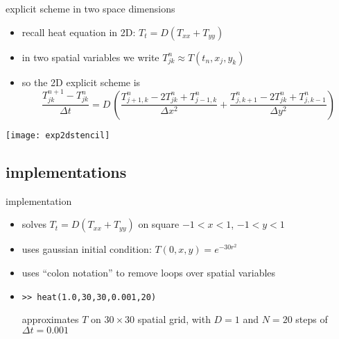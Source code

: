 \begin{frame}{explicit scheme in two space dimensions}

\begin{itemize}
\item recall heat equation in 2D: $T_t = D(T_{xx} + T_{yy})$
\item in two spatial variables we write $T_{jk}^n \approx T(t_n,x_j,y_k)$
\item so the 2D explicit scheme is
\small
	$$\frac{T_{jk}^{n+1} - T_{jk}^n}{\Delta t} = D\,\left(\frac{T_{j+1,k}^n - 2 T_{jk}^n + T_{j-1,k}^n}{\Delta x^2} + \frac{T_{j,k+1}^n - 2 T_{jk}^n + T_{j,k-1}^n}{\Delta y^2}\right)$$
\end{itemize}

\bigskip
\begin{center}
\texttt{[image: exp2dstencil]}
\end{center}
\end{frame}


\subsection{implementations}

\begin{frame}{implementation}
\label{slide:heatmatlab}


\small
\begin{itemize}
\item solves $T_t = D(T_{xx} + T_{yy})$ on square $-1 < x < 1$, $-1 < y < 1$
\item uses gaussian initial condition: $T(0,x,y) = e^{-30 r^2}$
\item uses ``colon notation'' to remove loops over spatial variables
\item \texttt{>>  heat(1.0,30,30,0.001,20)}

approximates $T$ on $30\times 30$ spatial grid, with $D=1$ and $N=20$ steps of $\Delta t = 0.001$
\end{itemize}
\end{frame}


